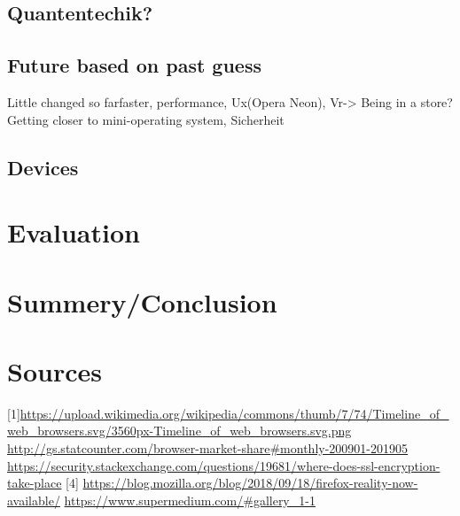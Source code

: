 \documentclass[runningheads]{llncs}
\begin{document}
		\subsection{Quantentechik?}
		\subsection{Future based on past guess}
		Little changed so farfaster, performance, Ux(Opera Neon), Vr-> Being in a store? Getting closer to mini-operating system, Sicherheit
		\subsection{Devices}

	\section{Evaluation}

	\section{Summery/Conclusion}
	\section{Sources}
	[1]\url{https://upload.wikimedia.org/wikipedia/commons/thumb/7/74/Timeline_of_web_browsers.svg/3560px-Timeline_of_web_browsers.svg.png}
	\newline
	[2] \url{http://gs.statcounter.com/browser-market-share#monthly-200901-201905}
	\newline
	[3]\url{https://security.stackexchange.com/questions/19681/where-does-ssl-encryption-take-place}
	[4]
	\url{https://blog.mozilla.org/blog/2018/09/18/firefox-reality-now-available/}
	\newline
	[5]
	\url{https://www.supermedium.com/#gallery_1-1}
	\newline
\end{document}
